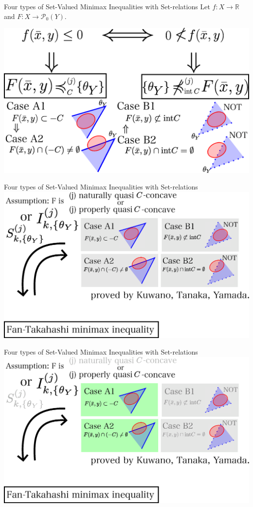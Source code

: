\documentclass[aspectratio=169, dvipdfmx, 11pt]{beamer}
\newcommand{\RealNumberSet}{\mathbb{R}}
\newcommand{\pow}[1]{\mathcal{P}_{0}(#1)}
\begin{document}
\begin{frame}{Four types of Set-Valued Minimax Inequalities with Set-relations}
  Let $f:X \to \RealNumberSet$ and $F:X \to \pow{Y}$.

  \centering
  \includegraphics[keepaspectratio, scale=0.35]{figures/eps/4types_set_relations.eps}
\end{frame}

\begin{frame}{Four types of Set-Valued Minimax Inequalities with Set-relations}
  \centering
  \includegraphics[keepaspectratio, scale=0.38]{figures/eps/kuwano_tanaka_yamada_results.eps}
\end{frame}

\begin{frame}{Four types of Set-Valued Minimax Inequalities with Set-relations}
  \centering
  \includegraphics[keepaspectratio, scale=0.38]{figures/eps/kuwano_tanaka_yamada_results_properly.eps}
\end{frame}
\end{document}
